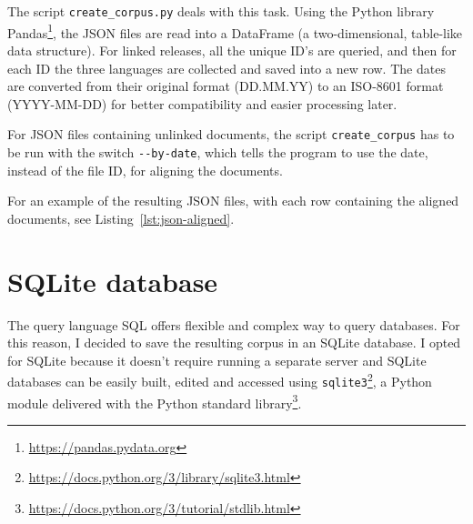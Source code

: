 The script \texttt{create\_corpus.py} deals with this task.
Using the Python library Pandas\footnote{\url{https://pandas.pydata.org}}, the JSON files are read into a DataFrame (a two-dimensional, table-like data structure). 
For linked releases, all the unique ID's are queried, and then for each ID the three languages are collected and saved into a new row. 
The dates are converted from their original format (DD.MM.YY) to an ISO-8601 format (YYYY-MM-DD) \autocite{enwiki:1095673391} for better compatibility and easier processing later.

For JSON files containing unlinked documents, the script \texttt{create\_corpus} has to be run with the switch \texttt{-{}-by-date}, which tells the program to use the date, instead of the file ID, for aligning the documents.

For an example of the resulting \acrshort{JSON} files, with each row containing the aligned documents, see Listing~\ref{lst:json-aligned}.




\section{SQLite database}
The query language SQL offers flexible and complex way to query databases. 
For this reason, I decided to save the resulting corpus in an SQLite database. 
I opted for SQLite because it doesn't require running a separate server and SQLite databases can be easily built, edited and accessed using \texttt{sqlite3}\footnote{\url{https://docs.python.org/3/library/sqlite3.html}}, a Python module delivered with the Python standard library\footnote{\url{https://docs.python.org/3/tutorial/stdlib.html}}.

